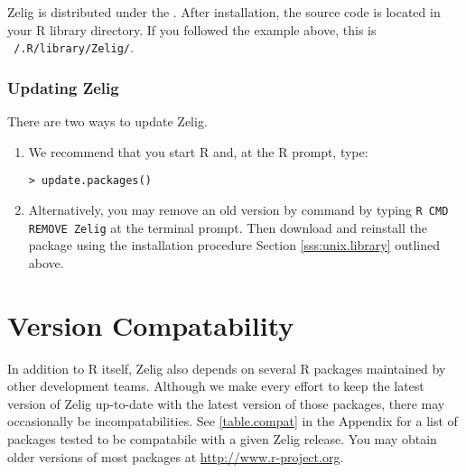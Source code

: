 Zelig is distributed under the .  After
installation, the source code is located in your R library directory.
If you followed the example above, this is {\tt ~/.R/library/Zelig/}.

\subsubsection{Updating Zelig} \label{sss:unix.updating}

There are two ways to update Zelig.  

\begin{enumerate}

\item We recommend that you start R and, at the R prompt, type:
\begin{verbatim}
> update.packages()
\end{verbatim}
  
\item Alternatively, you may remove an old version by command by
  typing {\tt R CMD REMOVE Zelig} at the terminal prompt.  Then
  download and reinstall the package using the installation
  procedure Section \ref{sss:unix.library} outlined above.

\end{enumerate}

\section{Version Compatability}

In addition to R itself, Zelig also depends on several R packages
maintained by other development teams.  Although we make every effort
to keep the latest version of Zelig up-to-date with the latest version
of those packages, there may occasionally be incompatabilities.  See
\ref{table.compat} in the Appendix for a list of packages tested to be
compatabile with a given Zelig release.  You may obtain older versions
of most packages at \url{http://www.r-project.org}.  
